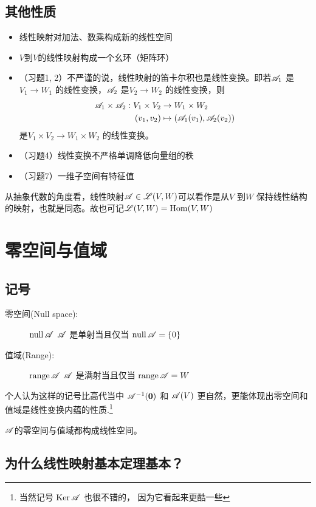 \subsection{其他性质}
\begin{itemize}
    \item 线性映射对加法、数乘构成新的线性空间
    \item \(V\)到\(V\)的线性映射构成一个幺环（矩阵环）
    \item （习题1, 2）不严谨的说，线性映射的笛卡尔积也是线性变换。即若\(\mathscr{A}_{1}\)
        是\(V_{1} \to W_{1}\) 的线性变换，\(\mathscr{A}_{2}\)
        是\(V_{2} \to W_{2}\) 的线性变换，则
        \begin{align*}
            \mathscr{A}_{1} \times \mathscr{A}_{2} : V_{1}
            \times V_{2} &\to W_{1} \times W_{2}\\
            (v_{1},v_{2}) &\mapsto
            (\mathscr{A}_{1}(v_{1}),\mathscr{A}_{2}(v_{2}))
        \end{align*}
        是\(V_{1} \times V_{2} \to
        W_{1} \times W_{2}\) 的线性变换。
    \item （习题4）线性变换不严格单调降低向量组的秩
    \item （习题7）一维子空间有特征值
\end{itemize}

从抽象代数的角度看，线性映射\(\mathscr{A} \in \mathscr{L}(V,W)\)可以看作是从\(V\) 到\(W\)
保持线性结构的映射，也就是同态。故也可记\(\mathscr{L}(V,W)=\operatorname{Hom}(V,W)\)

\section{零空间与值域}
\subsection{记号}
\begin{description}
    \item[零空间(Null space):] \(\operatorname{null} \mathscr{A}\)
        \(\mathscr{A}\) 是单射当且仅当
        \(\operatorname{null} \mathscr{A} = \{0\}\)
    \item[值域(Range):] \(\operatorname{range} \mathscr{A}\)
        \(\mathscr{A}\) 是满射当且仅当
        \(\operatorname{range} \mathscr{A} = W\)
\end{description}
个人认为这样的记号比高代当中 \(\mathscr{A}^{-1}(\mathbf{0})\) 和 \(\mathscr{A}(V)\)
更自然，更能体现出零空间和值域是线性变换内蕴的性质.\footnote{当然记号
    \(\operatorname{Ker} \mathscr{A}\) 也很不错的，
因为它看起来更酷一些 }

\(\mathscr{A}\)的零空间与值域都构成线性空间。

\subsection{为什么线性映射基本定理基本？}

